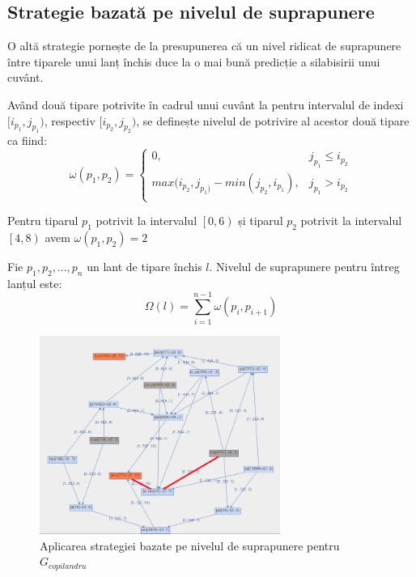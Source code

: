 \subsection{Strategie bazată pe nivelul de suprapunere}

O altă strategie pornește de la presupunerea că un nivel ridicat de suprapunere între tiparele unui lanț închis duce la o mai bună predicție a silabisirii unui cuvânt.

\begin{defi}
Având două tipare potrivite în cadrul unui cuvânt la pentru intervalul de indexi $[i_{p_1}, j_{p_1})$, respectiv $[i_{p_2}, j_{p_2})$, se definește nivelul de potrivire al acestor două tipare ca fiind:
\begin{equation}
\omega(p_1, p_2) = \left\{
\begin{matrix}
0, 					& j_{p_1} \leq i_{p_2}\\ 
max(i_{p_2},j_{p_1)} - min(j_{p_2},i_{p_1}),	& j_{p_1} > i_{p_2} \\
\end{matrix}
\right.
\end{equation}
\end{defi}

\begin{ex}
Pentru tiparul $p_1$ potrivit la intervalul $\left[0, 6\right)$ și tiparul $p_2$ potrivit la intervalul $\left[4, 8\right)$ avem $ \omega(p_1,p_2)=2$
\end{ex}

\begin{defi}
Fie $p_1, p_2, ..., p_n$ un lant de tipare închis $l$. Nivelul de suprapunere pentru întreg lanțul este:
\begin{equation}
\Omega(l) = \sum_{i=1}^{n-1}{ \omega(p_i, p_{i+1})}
\end{equation}
\end{defi}

\begin{figure}[h!]
    \centering
    \includegraphics[width=0.7\textwidth]{figures/rosil-overlapping.png}
    \caption{Aplicarea strategiei bazate pe nivelul de suprapunere pentru $G_{copilandru}$}
    \label{fig:rosil-overlapping}
\end{figure}

